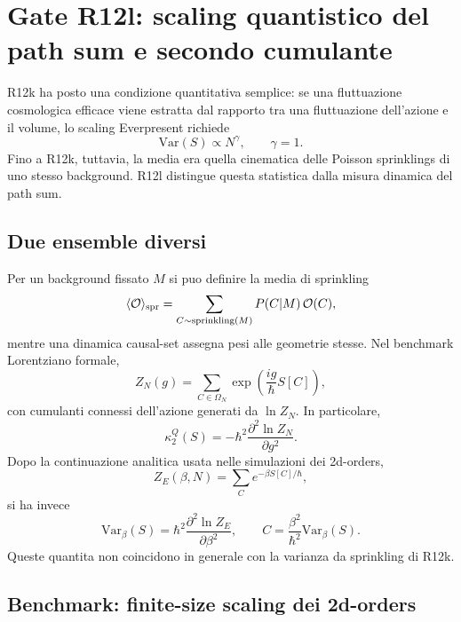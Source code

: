 \documentclass[11pt,a4paper]{article}
\begin{document}
\section{Gate R12l: scaling quantistico del path sum e secondo cumulante}

R12k ha posto una condizione quantitativa semplice: se una fluttuazione cosmologica efficace viene estratta dal rapporto tra una fluttuazione dell'azione e il volume, lo scaling Everpresent richiede
\begin{equation}
\mathrm{Var}(S)\propto N^{\gamma},\qquad \gamma=1.
\label{eq:r12l_target_gamma}
\end{equation}
Fino a R12k, tuttavia, la media era quella cinematica delle Poisson sprinklings di uno stesso background. R12l distingue questa statistica dalla misura dinamica del path sum.

\subsection{Due ensemble diversi}

Per un background fissato $M$ si puo definire la media di sprinkling
\begin{equation}
\langle\mathcal O\rangle_{\rm spr}=\sum_{C\sim {\rm sprinkling}(M)}P(C|M)\,\mathcal O(C),
\end{equation}
mentre una dinamica causal-set assegna pesi alle geometrie stesse. Nel benchmark Lorentziano formale,
\begin{equation}
Z_N(g)=\sum_{C\in\Omega_N}\exp\!\left(\frac{i g}{\hbar}S[C]\right),
\end{equation}
con cumulanti connessi dell'azione generati da $\ln Z_N$. In particolare,
\begin{equation}
\kappa_2^{Q}(S)=-\hbar^2\frac{\partial^2\ln Z_N}{\partial g^2}.
\label{eq:r12l_quantum_cumulant}
\end{equation}
Dopo la continuazione analitica usata nelle simulazioni dei 2d-orders,
\begin{equation}
Z_E(\beta,N)=\sum_C e^{-\beta S[C]/\hbar},
\end{equation}
si ha invece
\begin{equation}
\mathrm{Var}_{\beta}(S)=\hbar^2\frac{\partial^2\ln Z_E}{\partial\beta^2},
\qquad
C=\frac{\beta^2}{\hbar^2}\mathrm{Var}_{\beta}(S).
\label{eq:r12l_heat_variance}
\end{equation}
Queste quantita non coincidono in generale con la varianza da sprinkling di R12k.

\subsection{Benchmark: finite-size scaling dei 2d-orders}
\end{document}
